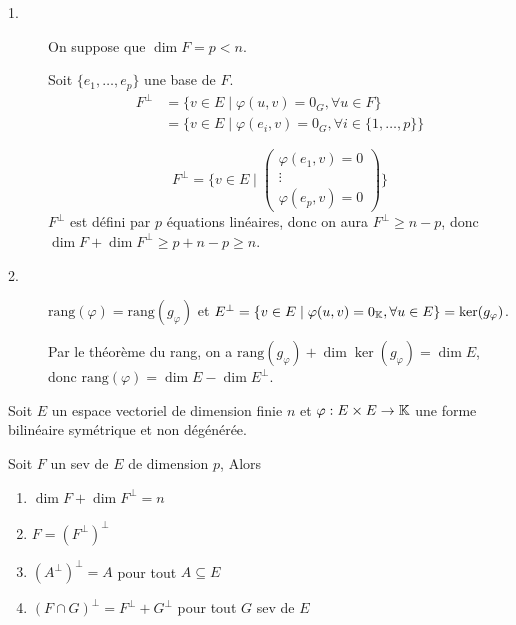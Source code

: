\documentclass[a4paper, 12pt]{article}
\begin{document}
\begin{demonstration}
    \begin{description}
        \item[1.]
        On suppose que $\dim F = p < n$.

        Soit $\{e_1, \dots, e_p\}$ une base de $F$.
        \begin{align*}
            F^\perp &= \{v \in E \mid \varphi(u, v) = 0_G, \forall u \in F\} \\
            &= \{v \in E \mid \varphi(e_i, v) = 0_G, \forall i \in \{1, \dots, p\}\}
        \end{align*}

        $$
        F^\perp = \{v \in E \mid \begin{pmatrix}
            \varphi(e_1, v) = 0 \\
            \vdots \\
            \varphi(e_p, v) = 0
        \end{pmatrix}
        \}
        $$
        $F^\perp$ est défini par $p$ équations linéaires, donc on aura $F^\perp \geq n - p$,
        donc $\dim F + \dim F^\perp \geq p + n - p \geq n$.

        \item[2.]
        $\text{rang}(\varphi) = \text{rang}(g_\varphi)$ et $E^\perp = \{ v \in E \mid \varphi(u, v) = 0_{\mathbb{K}}, \forall u \in E\} = \ker(g_\varphi)$.

        Par le théorème du rang, on a $\text{rang}(g_\varphi) + \dim \ker(g_\varphi) = \dim E$, donc $\text{rang}(\varphi) = \dim E - \dim E^\perp$.
    \end{description}
\end{demonstration}

\begin{proposition}{}{}
    Soit $E$ un espace vectoriel de dimension finie $n$ et $\varphi: E \times E \to \mathbb{K}$ une forme bilinéaire symétrique et non dégénérée.

    Soit $F$ un sev de $E$ de dimension $p$,
    Alors
    \begin{enumerate}
        \item $\dim F + \dim F^\perp = n$
        \item $F = (F^\perp)^\perp$
        \item $(A^\perp)^\perp = A$ pour tout $A \subseteq E$
        \item $(F \cap G)^\perp = F^\perp + G^\perp$ pour tout $G$ sev de $E$
    \end{enumerate}
\end{proposition}
\end{document}
